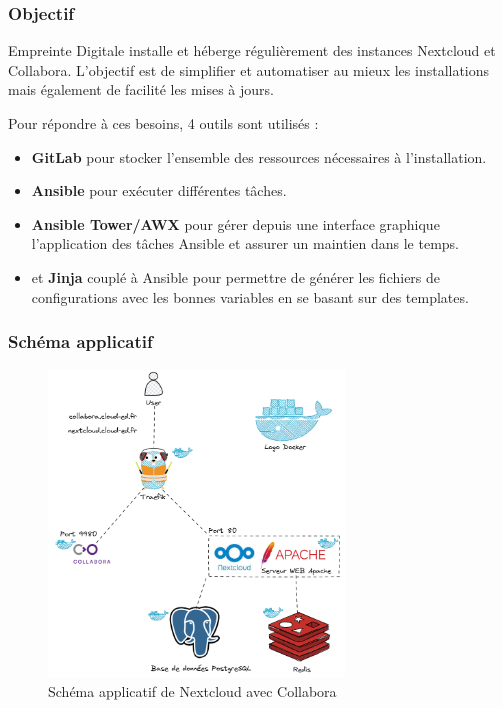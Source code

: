 \documentclass[12pt]{article}
\begin{document}
\subsubsection{Objectif}
Empreinte Digitale installe et héberge régulièrement des instances Nextcloud et Collabora. L'objectif est de simplifier et automatiser au mieux les installations mais également de facilité les mises à jours.

Pour répondre à ces besoins, 4 outils sont utilisés :
\begin{itemize}
    \item \textbf{GitLab} pour stocker l'ensemble des ressources nécessaires à l'installation.
    \item \textbf{Ansible} pour exécuter différentes tâches.
    \item \textbf{Ansible Tower/AWX} pour gérer depuis une interface graphique l'application des tâches Ansible et assurer un maintien dans le temps.
    \item et \textbf{Jinja} couplé à Ansible pour permettre de générer les fichiers de configurations avec les bonnes variables en se basant sur des templates.
\end{itemize}

\subsubsection{Schéma applicatif}
\begin{figure}[!ht]
    \centering
    \includegraphics[width=0.7\textwidth]{src/Nextcloud stack.png}
    \caption{Schéma applicatif de Nextcloud avec Collabora}
    \label{fig:nextcloudXcollabora}
\end{figure}
\end{document}
